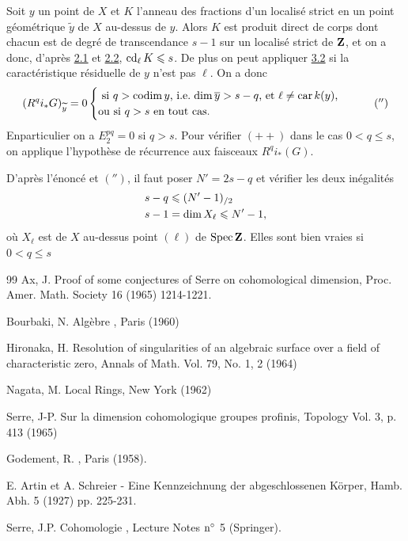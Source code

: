 \documentclass[10pt]{../fichiers-configuration-latex/smfart}
\begin{document}
Soit $y$ un point de $X$ et $K$ l'anneau des fractions d'un localisé
strict en un point géométrique $\widetilde{y}$ de $X$ au-dessus de
$y$. Alors $K$ est produit direct de corps dont chacun est de degré de
transcendance $s-1$ sur un localisé strict de $\mathbf{Z}$, et on a
donc, d'après \hyperref[X.thm2.1]{2.1} et \hyperref[X.thm2.2]{2.2}, $\operatorname{cd}_{\ell}K\leqslant s$. De plus on peut
appliquer \hyperref[X.prop3.2]{3.2} si la caractéristique résiduelle de $y$ n'est pas
$\ell$. On a donc
\begin{equation*}
(R^qi_{\ast}G)_{\widetilde{y}}=0
\begin{cases}
\mbox{ si $q>\operatorname{codim} y$, {i.e.}\kern.3em$\dim \overline{y}>s-q$, et $\ell\neq \operatorname{car}
k(y)$,}\\
\mbox{ou si $q>s$ en tout cas.}
\end{cases}
\tag{$''$}
\end{equation*}
En\pageoriginale particulier on a $E^{pq}_2=0$ si $q>s$. Pour vérifier
$({+}{+})$ dans le cas $0<q\leq s$, on applique l'hypothèse de
récurrence aux faisceaux $R^qi_{\ast}(G)$.

D'après l'énoncé et $('')$, il faut poser $N'=2s-q$ et vérifier les
deux inégalités
\begin{align*}
& s-q\leqslant (N'-1)_{/2}\\
& s-1=\dim X_{\ell}\leqslant N'-1{},
\end{align*}
où $X_{\ell}$ est  de $X$ au-dessus  point $(\ell)$ de
$\operatorname{Spec} \mathbf{Z}$. Elles sont bien vraies si $0<q\leq s$ \cqfd

\begin{thebibliography}{99}
Ax, J.  Proof of some conjectures of Serre on
cohomological dimension, Proc. Amer. Math. Society 16 (1965)
1214-1221.

 Bourbaki, N. Algèbre , Paris (1960)

Hironaka, H.  Resolution of singularities of an algebraic surface
over a field of characteristic zero, Annals of Math. Vol. 79, No. 1, 2
(1964)

 
 Nagata, M. Local Rings, New York (1962)

Serre, J-P.  Sur la dimension cohomologique  groupes profinis,
Topology Vol. 3, p. 413 (1965)


 Godement, R. , Paris (1958).

E. Artin et A.  Schreier - Eine Kennzeichnung der 
abgeschlossenen Körper, Hamb. Abh. 5 (1927) pp. 225-231.


 Serre, J.P. Cohomologie , Lecture Notes
${\rm n^{\circ}}$ 5 (Springer).
\end{thebibliography}

\ifx\danslelivre\undefined
\end{document}
